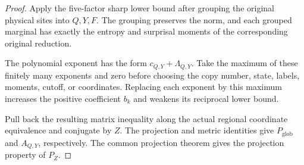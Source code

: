 \begin{proof}\leanok
  Apply the five-factor sharp lower bound after grouping the original
  physical sites into $Q,Y,F$. The grouping preserves the norm, and each
  grouped marginal has exactly the entropy and surprisal moments of the
  corresponding original reduction.

  The polynomial exponent has the form $c_{Q,Y}+\Lambda_{Q,Y}$.
  Take the maximum of these finitely many exponents and zero before
  choosing the copy number, state, labels, moments, cutoff, or coordinates.
  Replacing each exponent by this maximum increases the positive
  coefficient $b_k$ and weakens its reciprocal lower bound.

  Pull back the resulting matrix inequality along the actual regional
  coordinate equivalence and conjugate by $Z$. The projection and metric
  identities give $P_{\mathrm{glob}}$ and $A_{Q,Y}$, respectively.
  The common projection theorem gives the projection property of $P_Z$.
\end{proof}

